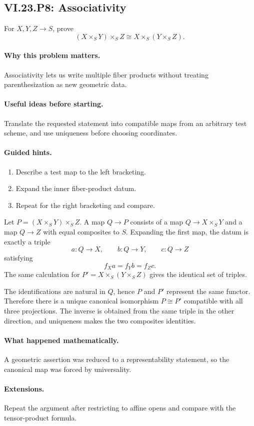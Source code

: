 \subsection*{VI.23.P8: Associativity}
\begin{problem}\label{prob:vi23-p08}
For $X,Y,Z\to S$, prove
\[
(X\times_SY)\times_SZ\cong X\times_S(Y\times_SZ).
\]
\end{problem}

\ifdefined\FullProblemDossiers
\paragraph{Why this problem matters.}
Associativity lets us write multiple fiber products without treating parenthesization as new geometric data.

\paragraph{Useful ideas before starting.}
Translate the requested statement into compatible maps from an arbitrary test scheme, and use uniqueness before choosing coordinates.

\paragraph{Guided hints.}
\begin{enumerate}
\item Describe a test map to the left bracketing.
\item Expand the inner fiber-product datum.
\item Repeat for the right bracketing and compare.
\end{enumerate}

\begin{solution}
Let $P=(X\times_SY)\times_SZ$.  A map $Q\to P$ consists of a map
$Q\to X\times_SY$ and a map $Q\to Z$ with equal composites to $S$.  Expanding the first map,
the datum is exactly a triple
\[
a:Q\to X,\qquad b:Q\to Y,\qquad c:Q\to Z
\]
satisfying
\[
f_Xa=f_Yb=f_Zc.
\]
The same calculation for $P'=X\times_S(Y\times_SZ)$ gives the identical set of triples.

The identifications are natural in $Q$, hence $P$ and $P'$ represent the same functor.  Therefore
there is a unique canonical isomorphism $P\cong P'$ compatible with all three projections.
The inverse is obtained from the same triple in the other direction, and uniqueness makes the
two composites identities.
\end{solution}

\paragraph{What happened mathematically.}
A geometric assertion was reduced to a representability statement, so the canonical map was forced by universality.

\paragraph{Extensions.}
Repeat the argument after restricting to affine opens and compare with the tensor-product formula.
\fi
